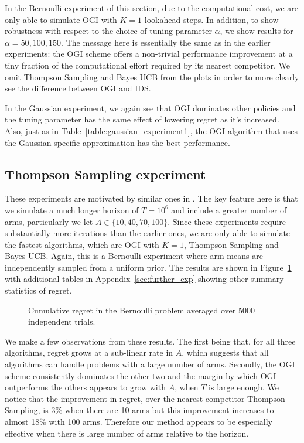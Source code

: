 In the Bernoulli experiment of this section, due to the computational cost, we are only able to simulate OGI with $K = 1$ lookahead steps. In addition, to show robustness with respect to the choice of tuning parameter $\alpha$, we show results for $\alpha = 50,100,150$. The message here is essentially the same as in the earlier experiments: the OGI scheme offers a non-trivial performance improvement at a tiny fraction of the computational effort required by its nearest competitor. We omit Thompson Sampling and Bayes UCB from the plots in order to more clearly see the difference between OGI and IDS.

In the Gaussian experiment, we again see that OGI dominates other policies and the tuning parameter has the same effect of lowering regret as it's increased. Also, just as in Table~\ref{table:gaussian_experiment1}, the OGI algorithm that uses the Gaussian-specific approximation has the best performance. 

\subsection{Thompson Sampling experiment} \label{exp:ts_sampling_experiment}
These experiments are motivated by similar ones in \cite{chapelle2011empirical}. The key feature here is that we simulate a much longer horizon of $T = 10^6$ and include a greater number of arms, particularly we let $A \in \{10,40,70,100\}$. Since these experiments require substantially more iterations than the earlier ones, we are only able to simulate the fastest algorithms, which are OGI with $K=1$, Thompson Sampling and Bayes UCB. Again, this is a Bernoulli experiment where arm means are independently sampled from a uniform prior. The results are shown in Figure~\ref{fig:chapelle_and_li} with additional tables in Appendix~\ref{sec:further_exp} showing other summary statistics of regret.
\begin{figure}
	\centering
	
	\caption{Cumulative regret in the Bernoulli problem averaged over 5000 independent trials.}
	\label{fig:chapelle_and_li}
\end{figure}

We make a few observations from these results. The first being that, for all three algorithms, regret grows at a sub-linear rate in $A$, which suggests that all algorithms can handle problems with a large number of arms. Secondly, the OGI scheme consistently dominates the other two and the margin by which OGI outperforms the others appears to grow with $A$, when $T$ is large enough. We notice that the improvement in regret, over the nearest competitor Thompson Sampling, is 3\% when there are 10 arms but this improvement increases to almost 18\% with 100 arms. Therefore our method appears to be especially effective when there is large number of arms relative to the horizon.
